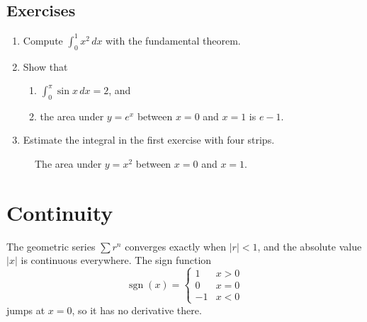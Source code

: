 \documentclass[11pt]{article}
\begin{document}
\subsection{Exercises}

\begin{enumerate}
  \item Compute $\int_0^1 x^2\,dx$ with the fundamental theorem.
  \item Show that
  \begin{enumerate}
    \item $\int_0^{\pi} \sin x\,dx = 2$, and
    \item the area under $y = e^x$ between $x = 0$ and $x = 1$ is $e - 1$.
  \end{enumerate}
  \item Estimate the integral in the first exercise with four strips.
\end{enumerate}

\begin{figure}[h]
  \centering
  \caption{The area under $y = x^2$ between $x = 0$ and $x = 1$.}
  \label{fig:area}
\end{figure}

\section{Continuity}

The geometric series $\sum r^n$ converges exactly when $\lvert r\rvert < 1$, and the
absolute value $\lvert x\rvert$ is continuous everywhere. The sign function
\[
  \operatorname{sgn}(x) =
  \begin{cases}
    1 & x > 0 \\
    0 & x = 0 \\
    -1 & x < 0
  \end{cases}
\]
jumps at $x = 0$, so it has no derivative there.
\end{document}
